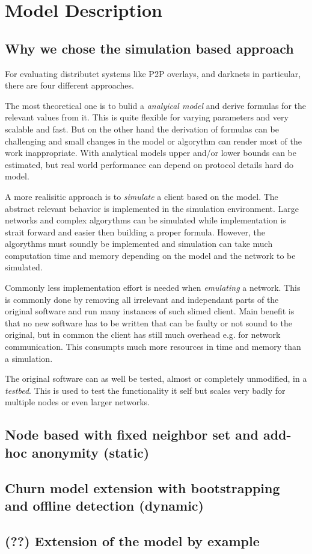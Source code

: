 \chapter{Model Description}

\section{Why we chose the simulation based approach}

For evaluating distributet systems like P2P overlays, and darknets in particular, there are four different approaches.

The most theoretical one is to bulid a \emph{analyical model} and derive formulas for the relevant values from it. This is quite flexible for varying parameters and very scalable and fast. But on the other hand the derivation of formulas can be challenging and small changes in the model or algorythm can render most of the work inappropriate. With analytical models upper and/or lower bounds can be estimated, but real world performance can depend on protocol details hard do model.

A more realisitic approach is to \emph{simulate} a client based on the model. The abstract relevant behavior is implemented in the simulation environment. Large networks and complex algorythms can be simulated while implementation is strait forward and easier then building a proper formula. However, the algorythms must soundly be implemented and simulation can take much computation time and memory depending on the model and the network to be simulated.

Commonly less implementation effort is needed when \emph{emulating} a network. This is commonly done by removing all irrelevant and independant parts of the original software and run many instances of such slimed client. Main benefit is that no new software has to be written that can be faulty or not sound to the original, but in common the client has still much overhead e.g. for network communication. This consumpts much more resources in time and memory than a simulation.

The original software can as well be tested, almost or completely unmodified, in a \emph{testbed}. This is used to test the functionality it self but scales very badly for multiple nodes or even larger networks. 

\section{Node based with fixed neighbor set and add-hoc anonymity (static)}



\section{Churn model extension with bootstrapping and offline detection (dynamic)}
\section{(??) Extension of the model by example}
